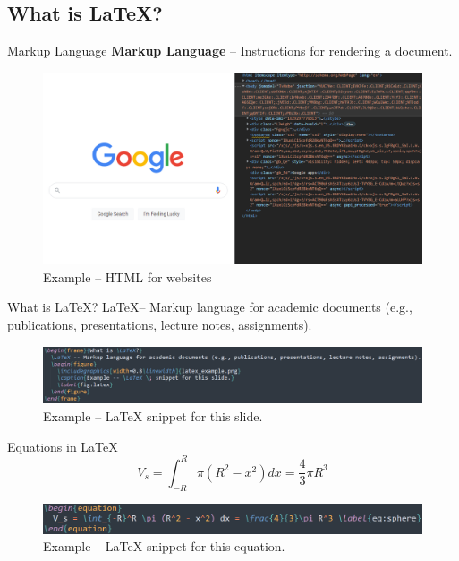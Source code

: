 \documentclass{beamer}
\begin{document}
{\subsection{What is \LaTeX?}

  \begin{frame}{Markup Language}
    \textbf{Markup Language} -- Instructions for rendering a document.
    \begin{figure}
      \includegraphics[width=0.8\linewidth]{google_html.png}
      \caption{Example -- HTML for websites}
      \label{fig:html}
    \end{figure}
  \end{frame}

  \begin{frame}{What is \LaTeX?}
    \LaTeX -- Markup language for academic documents (e.g., publications, presentations, lecture notes, assignments).
    \begin{figure}
      \includegraphics[width=0.8\linewidth]{latex_example.png}
      \caption{Example -- \LaTeX{}  snippet for this slide.}
      \label{fig:latex}
    \end{figure}
  \end{frame}


  \begin{frame}{Equations in \LaTeX}
    \begin{equation}
      V_s = \int_{-R}^R \pi (R^2 - x^2) dx = \frac{4}{3}\pi R^3 \label{eq:sphere}
    \end{equation}
    \begin{figure}
      \includegraphics[width=0.8\linewidth]{equation_example.png}
      \caption{Example -- \LaTeX{} snippet for this equation.}
      \label{fig:equation}
    \end{figure}
  \end{frame}

}
\end{document}
